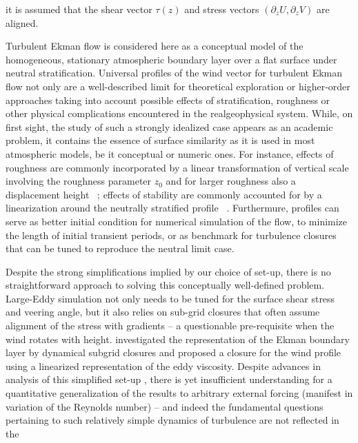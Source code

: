 \documentclass[a4paper,11pt]{amsart}
\newcommand{\p}{\partial}
\begin{document}
it is assumed that the shear vector $\tau(z)$ and stress vectors $(\p_zU,\p_zV)$ are aligned. 
%
\par
%
Turbulent Ekman flow is considered here as a conceptual model of the
homogeneous, stationary atmospheric boundary layer over a flat surface under neutral stratification. 
%
Universal profiles of the wind vector for turbulent Ekman flow not only are a well-described limit
for theoretical exploration or higher-order approaches taking into account possible effects of stratification,
roughness or other physical complications encountered in the realgeophysical system.
%
While, on first sight, the study of such a strongly idealized case appears as an academic problem, it contains the essence
of surface similarity as it is used in most atmospheric models, be it conceptual or numeric ones.
%
For instance, effects of roughness are commonly incorporated by a linear transformation of vertical scale involving the
roughness parameter $z_0$ and for larger roughness also a displacement height~%
\citep{monin:1975,jacobs:AFM1988,hogstrom:BM1988}; 
effects of stability are commonly accounted for by a linearization around the neutrally stratified profile~%
\citep{monin:ARF1970, monin:1975, hogstrom:BM1988, hogstrom:BM1996,sakagami:BM2020}.
%
Furthermure, profiles can serve as better initial condition for numerical simulation of the flow,
to minimize the length of initial transient periods, or as benchmark for turbulence
closures that can be tuned to reproduce the neutral limit case.
%
\par
%
Despite the strong simplifications implied by our choice of set-up, there is no straightforward approach to solving
this conceptually well-defined problem.
%
Large-Eddy simulation not only needs to be tuned for the surface shear stress and veering angle, but it also
relies on sub-grid closures that often assume alignment of the stress with gradients -- a questionable
pre-requisite when the wind rotates with height.
%
\citet{esau:EFM2004} investigated the representation of the Ekman boundary layer by dynamical subgrid closures
and \cite{zikanov:JFM2003} proposed a closure for the wind profile using a linearized representation of the eddy viscosity.
%
Despite advances in analysis of this simplified set-up \citep{jiang:JAS2018}, 
there is yet insufficient understanding for a quantitative generalization of the results to
arbitrary external forcing (manifest in variation of the Reynolds number) -- and indeed the fundamental
questions pertaining to such relatively simple dynamics of turbulence are not reflected in the
\end{document}

